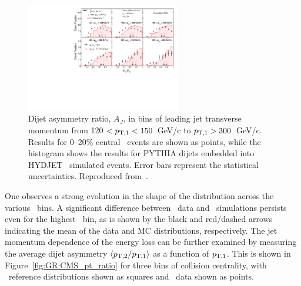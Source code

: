 \begin{figure}[!th]
\begin{center}
\includegraphics[width=0.6\textwidth]{jetfigures/dijet_imbalance5_0to20_pt_20120103_subt.pdf}
\caption{Dijet asymmetry ratio, $A_{J}$, in bins of leading jet transverse momentum from
120 $ < p_{\rm{T},1} < 150$~GeV/c to $p_{\rm{T},1} > 300$~GeV/c. 
Results for 0--20\% central \PbPb\ events are shown as points, while the histogram
shows the results for PYTHIA dijets embedded into HYDJET \PbPb\ simulated events. 
Error bars represent the statistical uncertainties.  Reproduced from~\cite{CMS_dijet}.}
\label{fig:GR:CMS_dijet_pt}
\end{center}
\end{figure}
One observes a strong evolution in the shape of the distribution across the
various \pT\ bins. A significant difference between \PbPb\ data and
\PYTHYD\ simulations persists even for the highest \pT\ bin, as is shown
by the black and red/dashed arrows indicating the mean of the data and 
MC distributions, respectively.
The jet momentum dependence of the energy loss can be further examined by measuring the
average dijet asymmetry $\langle p_{\rm{T},2}/p_{\rm{T},1} \rangle$ as a function of $p_{\rm{T},1}$. 
This is shown in Figure~\ref{fig:GR:CMS_pt_ratio} for three bins of collision centrality, 
with \PYTHYD\ reference distributions shown as squares and \PbPb\ data shown as points.

